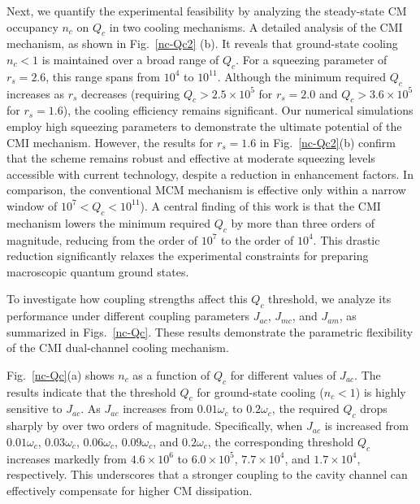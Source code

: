 \documentclass[aps, prresearch, reprint, nofootinbib, longbibliography]{revtex4-2}
\begin{document}
Next, we quantify the experimental feasibility by analyzing the steady-state CM occupancy $n_c$ on
$Q_c$ in two cooling mechanisms.
A detailed analysis of the CMI mechanism, as shown in Fig.~\ref{nc-Qc2} (b).
It reveals that ground-state cooling \(n_c<1\) is maintained over a broad range of \(Q_c\). For a squeezing parameter of $r_s = 2.6$, this range spans from $10^4$ to $10^{11}$. Although the minimum required $Q_c$ increases as $r_s$ decreases (requiring $Q_c > 2.5 \times 10^5$ for $r_s = 2.0$ and $Q_c > 3.6 \times 10^5$ for $r_s = 1.6$), the cooling efficiency remains significant. 
Our numerical simulations employ high squeezing parameters to demonstrate the ultimate potential of the CMI mechanism. However, the results for $r_s=1.6$
in Fig.~\ref{nc-Qc2}(b) confirm that the scheme remains robust and effective at moderate squeezing levels accessible with current technology, despite a reduction in enhancement factors.
In comparison, the conventional MCM mechanism is effective only within a narrow window of %
$10^7 < Q_c < 10^{11}$).	 
A central finding of this work is that the CMI mechanism lowers the minimum required $Q_c$
by more than three orders of magnitude, reducing from the order of $10^7$
to the order of $10^4$.
This drastic reduction significantly relaxes the experimental constraints for preparing macroscopic quantum ground states.


To investigate how coupling strengths affect this $Q_c$ threshold, we analyze its performance under different coupling parameters $J_{ac}$, $J_{mc}$, and $J_{am}$, as summarized in Figs.~\ref{nc-Qc}. These results demonstrate the parametric flexibility of the CMI dual-channel cooling mechanism.


Fig.~\ref{nc-Qc}(a) shows $n_c$ as a function of $Q_c$ for different values of $J_{ac}$. The results indicate that 
the threshold $Q_c$ for ground-state cooling ($n_c < 1$) is highly sensitive to  $J_{ac}$.
As $J_{ac}$
increases from $0.01\omega_c$ to $0.2\omega_c$, the required $Q_c$
drops sharply by over two orders of magnitude. 
Specifically, when $J_{ac}$ is increased from $0.01\omega_c$,  $0.03\omega_c$, $0.06\omega_c$, $0.09\omega_c$, and $0.2\omega_c$, the corresponding threshold $Q_c$ increases markedly from $4.6\times 10^6$ to $6.0\times 10^5$, $7.7\times 10^4$, and $1.7\times 10^4$, respectively.
This underscores that a stronger coupling to the cavity channel can effectively compensate for higher CM dissipation.
\end{document}
